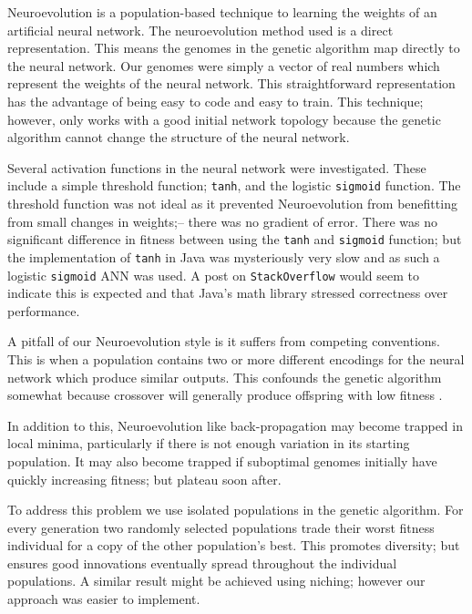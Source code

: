 Neuroevolution is a population-based technique to learning the weights of an artificial neural network.  The neuroevolution method used is a direct representation. This means the genomes in the genetic algorithm map directly to the neural network. Our genomes were simply a vector of real numbers which represent the weights of the neural network. This straightforward representation has the advantage of being easy to code and easy to train. This technique; however, only works with a good initial network topology because the genetic algorithm cannot change the structure of the neural network.


Several activation functions in the neural network were investigated. These include a simple threshold function; \texttt{tanh}, and the logistic \texttt{sigmoid} function. The threshold function was not ideal as it prevented Neuroevolution from benefitting from small changes in weights;-- there was no gradient of error. There was no significant difference in fitness between using the \texttt{tanh} and \texttt{sigmoid} function; but the implementation of \texttt{tanh} in Java was mysteriously very slow and as such a logistic \texttt{sigmoid} ANN was used. A post on \texttt{StackOverflow} \cite{slowtanh} would seem to indicate this is expected and that Java's math library stressed correctness over performance.

A pitfall of our Neuroevolution style is it suffers from competing conventions. This is when a population contains two or more different encodings for the neural network which produce similar outputs. This confounds the genetic algorithm somewhat because crossover will generally produce offspring with low fitness \cite{mattiussi2011beyond}.

In addition to this, Neuroevolution like back-propagation may become trapped in local minima, particularly if there is not enough variation in its starting population. It may also become trapped if suboptimal genomes initially have quickly increasing fitness; but plateau soon after.

To address this problem we use isolated populations in the genetic algorithm. For every generation two randomly selected populations trade their worst fitness individual for a copy of the other population's best. This promotes diversity; but ensures good innovations eventually spread throughout the individual populations. A similar result might be achieved using niching; however our approach was easier to implement.


